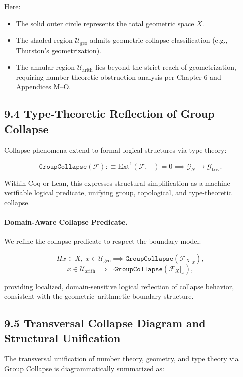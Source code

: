 \documentclass[11pt]{article}
\begin{document}
Here:

\begin{itemize}
    \item The solid outer circle represents the total geometric space \( X \).
    \item The shaded region \( \mathcal{U}_{\mathrm{geo}} \) admits geometric collapse classification (e.g., Thurston's geometrization).
    \item The annular region \( \mathcal{U}_{\mathrm{arith}} \) lies beyond the strict reach of geometrization, requiring number-theoretic obstruction analysis per Chapter 6 and Appendices M–O.
\end{itemize}

\subsection*{9.4 Type-Theoretic Reflection of Group Collapse}

Collapse phenomena extend to formal logical structures via type theory:

\[
\texttt{GroupCollapse}(\mathcal{F}) :\equiv \mathrm{Ext}^1(\mathcal{F}, -) = 0 \implies \mathcal{G}_{\mathcal{F}} \longrightarrow \mathcal{G}_{\mathrm{triv}}.
\]

Within Coq or Lean, this expresses structural simplification as a machine-verifiable logical predicate, unifying group, topological, and type-theoretic collapse.

\paragraph{Domain-Aware Collapse Predicate.}

We refine the collapse predicate to respect the boundary model:

\[
\Pi x \in X,\;
x \in \mathcal{U}_{\mathrm{geo}} \implies \texttt{GroupCollapse}(\mathcal{F}_X|_x),
\]
\[
x \in \mathcal{U}_{\mathrm{arith}} \implies \neg \texttt{GroupCollapse}(\mathcal{F}_X|_x),
\]

providing localized, domain-sensitive logical reflection of collapse behavior, consistent with the geometric–arithmetic boundary structure.


\subsection*{9.5 Transversal Collapse Diagram and Structural Unification}

The transversal unification of number theory, geometry, and type theory via Group Collapse is diagrammatically summarized as:
\end{document}
